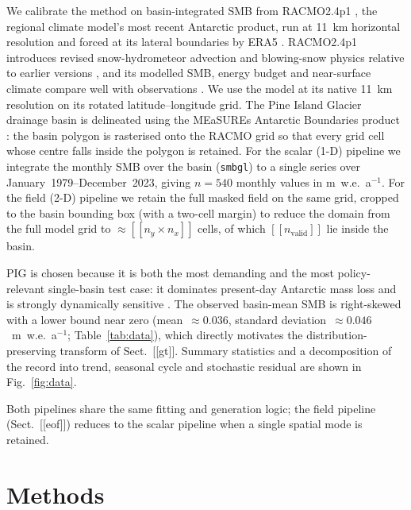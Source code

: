 We calibrate the method on basin-integrated SMB from RACMO2.4p1
\citep{vandalum2025}, the regional climate model's most recent Antarctic
product, run at 11~km horizontal resolution and forced at its lateral
boundaries by ERA5 \citep{hersbach2020}. RACMO2.4p1 introduces revised
snow-hydrometeor advection and blowing-snow physics relative to earlier
versions \citep{vandalum2024}, and its modelled SMB, energy budget and
near-surface climate compare well with observations \citep{vandalum2025}.
We use the model at its native 11~km resolution on its rotated
latitude--longitude grid. The Pine Island Glacier drainage basin is
delineated using the MEaSUREs Antarctic Boundaries product
\citep{mouginot2017}: the basin polygon is rasterised onto the RACMO grid so
that every grid cell whose centre falls inside the polygon is retained. For
the scalar (1-D) pipeline we integrate the monthly SMB over the basin
(\texttt{smbgl}) to a single series over January~1979--December~2023, giving
$n=540$ monthly values in m~w.e.~a$^{-1}$. For the field (2-D) pipeline we
retain the full masked field on the same grid, cropped to the basin bounding
box (with a two-cell margin) to reduce the domain from the full model grid
to $\approx[[n_y\times n_x]]$ cells, of which $[[n_{\mathrm{valid}}]]$ lie
inside the basin.

PIG is chosen because it is both the most demanding and the most
policy-relevant single-basin test case: it dominates present-day Antarctic
mass loss and is strongly dynamically sensitive \citep{rignot2019}. The
observed basin-mean SMB is right-skewed with a lower bound near zero
(mean~$\approx0.036$, standard deviation~$\approx0.046$~m~w.e.~a$^{-1}$;
Table~\ref{tab:data}), which directly motivates the distribution-preserving
transform of Sect.~[[gt]]. Summary statistics and a decomposition of the
record into trend, seasonal cycle and stochastic residual are shown in
Fig.~\ref{fig:data}.

Both pipelines share the same fitting and generation logic; the field
pipeline (Sect.~[[eof]]) reduces to the scalar pipeline when a single spatial
mode is retained.


\section{Methods}\label{sec:methods}

